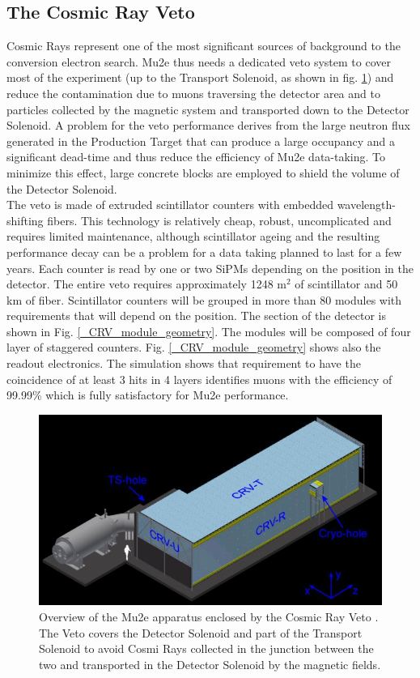 \documentclass[12pt,a4paper,openright, oneside, titlepage]{book} %
\begin{document}
\subsection{The Cosmic Ray Veto}
Cosmic Rays represent one of the most significant sources of background to the conversion electron search.
Mu2e thus needs a dedicated veto system \cite{CRV:2019} to cover most of the experiment 
(up to the Transport Solenoid, as shown in fig. \ref{_CRV}) and reduce the contamination due to muons traversing the detector area 
and to particles collected by the magnetic system and transported down to the Detector Solenoid. 
A problem for the veto performance derives from the large neutron flux generated 
in the Production Target that can produce a large occupancy and a significant dead-time and thus reduce the efficiency
of Mu2e data-taking. To minimize this effect, large concrete blocks are employed to shield the volume of the Detector Solenoid.\\
The veto is made of extruded scintillator counters with embedded wavelength-shifting fibers.
This technology is relatively cheap, robust, uncomplicated and requires limited maintenance, 
although scintillator ageing and the resulting performance decay can be a problem for a
data taking planned to last for a few years.
Each counter is read by one or two SiPMs depending on the position in the detector. 
The entire veto requires approximately 1248 m$^2$ of scintillator and 50 km of fiber. 
Scintillator counters will be grouped in more than 80 modules with requirements that will depend on the position.
The section of the detector is shown in Fig. \ref{_CRV_module_geometry}.
The modules will be composed of four layer of staggered counters. 
Fig. \ref{_CRV_module_geometry} shows also the readout electronics. 
The simulation shows that requirement to have the coincidence of at least 3 hits in 4 layers
identifies muons with the efficiency of 99.99\% which is fully satisfactory for Mu2e performance.


\begin{figure}[h!]
\centering
\includegraphics[scale=2]{CRV}
\caption[Cosmic Rays Veto system]{Overview of the Mu2e apparatus enclosed by the 
Cosmic Ray Veto \cite{CRV:2019}. 
The Veto covers the Detector Solenoid and part of the 
Transport Solenoid to avoid Cosmi Rays collected in the junction 
between the two and transported in the Detector Solenoid by the magnetic fields.}
\label{_CRV}
\end{figure}
\end{document}
